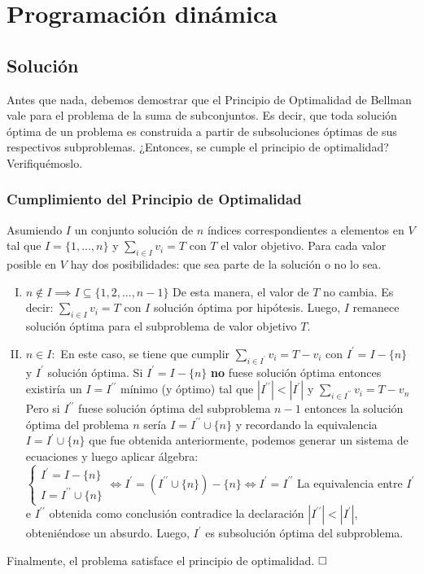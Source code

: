 \section{Programación dinámica}
\subsection{Solución}
Antes que nada, debemos demostrar que el Principio de Optimalidad de Bellman vale para el problema de la suma de subconjuntos. Es decir, que toda solución óptima de un problema es construida a partir de subsoluciones óptimas de sus respectivos subproblemas. ¿Entonces, se cumple el principio de optimalidad? Verifiquémoslo.

\subsubsection{Cumplimiento del Principio de Optimalidad}
Asumiendo $I$ un conjunto solución de $n$ índices correspondientes a elementos en $V$ tal que $I=\{1, ..., n\}$ y $\sum_{i \in I}v_{i} = T$ con $T$ el valor objetivo. Para cada valor posible en $V$ hay dos posibilidades: que sea parte de la solución o no lo sea.

\begin{enumerate}[I)]
\item $n \notin I \implies I \subseteq \{1, 2, ..., n-1\}$
	\vskip 0pt
	De esta manera, el valor de $T$ no cambia. Es decir: $\sum_{i \in I}v_{i}=T$ con $I$ solución óptima por hipótesis. Luego, $I$ remanece solución óptima para el subproblema de valor objetivo $T$.
\item $n \in I:$
	\vskip 0pt
	En este caso, se tiene que cumplir $\sum_{i \in I^\prime}v_{i}=T-v_{i}$ con $I^\prime=I-\{n\}$ y $I^\prime$ solución óptima.
	\vskip 8pt
	Si $I^\prime=I-\{n\}$ \textbf{no} fuese solución óptima entonces existiría un $I=I^{\prime\prime}$ mínimo (y óptimo) tal que $|I^{\prime\prime}| < |I^\prime|$ y $\sum_{i \in I^{\prime\prime}}v_{i} = T - v_{n}$
	\vskip 8pt
	Pero si $I^{\prime\prime}$ fuese solución óptima del subproblema $n-1$ entonces la solución óptima del problema $n$ sería $I = I^{\prime\prime} \cup \{n\}$ y recordando la equivalencia $I=I^\prime \cup \{n\}$ que fue obtenida anteriormente, podemos generar un sistema de ecuaciones y luego aplicar álgebra:
	\vskip 8pt
	$
		\begin{cases}
			I^\prime = I - \{n\} \\ 
			I = I^{\prime\prime} \cup \{n\}
		\end{cases}
		\iff
		I^\prime = (I^{\prime\prime} \cup \{n\}) - \{n\} \iff I^\prime = I^{\prime\prime}
	$
	\vskip 8pt
	La equivalencia entre $I^\prime$ e $I^{\prime\prime}$ obtenida como conclusión contradice la declaración $|I^{\prime\prime}| < |I^\prime|$, obteniéndose un absurdo. Luego, $I^\prime$ es subsolución óptima del subproblema.
\end{enumerate}
Finalmente, el problema satisface el principio de optimalidad.
\vskip 8pt
$\qedwhite$

